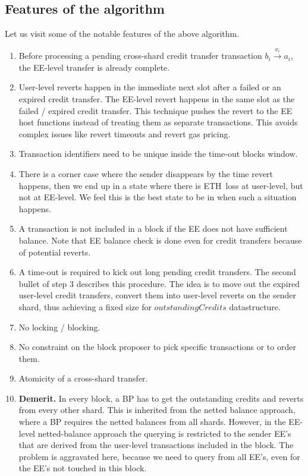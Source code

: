 \documentclass{article}
\newcommand{\eth}[0]{ETH~}
\begin{document}
\subsection{Features of the algorithm}
Let us visit some of the notable features of the above algorithm.
\begin{enumerate}
\item Before processing a pending cross-shard credit transfer transaction $b_i \stackrel{x_i}{\longrightarrow} a_i$, the EE-level transfer is already complete. 
\item User-level reverts happen in the immediate next slot after a failed or an expired credit transfer. The EE-level revert happens in the same slot as the failed / expired credit transfer. This technique pushes the revert to the EE host functions instead of treating them as separate transactions. This avoids complex issues like revert timeouts and revert gas pricing.
\item Transaction identifiers need to be unique inside the time-out blocks window.
\item There is a corner case where the sender disappears by the time revert happens, then we end up in a state where there is \eth loss at user-level, but not at EE-level. We feel this is the best state to be in when such a situation happens.
\item A transaction is not included in a block if the EE does not have sufficient balance. Note that EE balance check is done even for credit transfers because of potential reverts.
\item A time-out is required to kick out long pending credit transfers. The second bullet of step 3 describes this procedure. The idea is to move out the expired user-level credit transfers, convert them into user-level reverts on the sender shard, thus achieving a fixed size for $outstandingCredits$ datastructure.
\item No locking / blocking.
\item No constraint on the block proposer to pick specific transactions or to order them.
\item Atomicity of a cross-shard transfer.
\item {\bf Demerit.} In every block, a BP has to get the outstanding credits and reverts from every other shard. This is inherited from the netted balance approach, where a BP requires the netted balances from all shards. However, in the EE-level netted-balance approach the querying is restricted to the sender EE's that are derived from the user-level transactions included in the block. The problem is aggravated here, because we need to query from all EE's, even for the EE's not touched in this block.
\end{enumerate}
\end{document}
